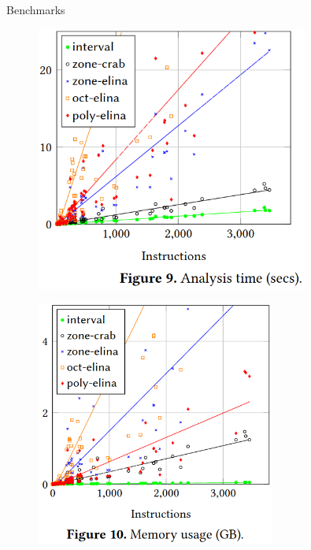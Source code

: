 \documentclass[aspectratio=169]{beamer}
\begin{document}
\begin{frame}{Benchmarks}
  \begin{minipage}{0.45\textwidth}
    \begin{figure}
      \includegraphics[width=0.8\textwidth]{analysis-time.png}
    \end{figure}
  \end{minipage}
  \begin{minipage}{0.5\textwidth}
    \begin{figure}
      \includegraphics[width=0.7\textwidth]{memory-usage.png}
    \end{figure}
  \end{minipage}
  \begin{itemize}

\end{itemize}
\end{frame}
\end{document}
